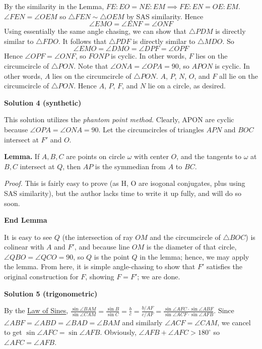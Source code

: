 \begin{enumerate}
 By the similarity in the Lemma, $FE: EO = NE: EM\implies FE: EN = OE: EM$. $\angle FEN = \angle OEM$ so $\triangle FEN\sim\triangle OEM$ by SAS similarity. Hence
 \[\angle EMO = \angle ENF = \angle ONF\]Using essentially the same angle chasing, we can show that $\triangle PDM$ is directly similar to $\triangle FDO$. It follows that $\triangle PDF$ is directly similar to $\triangle MDO$. So
 \[\angle EMO = \angle DMO = \angle DPF = \angle OPF\]Hence $\angle OPF = \angle ONF$, so $FONP$ is cyclic. In other words, $F$ lies on the circumcircle of $\triangle PON$. Note that $\angle ONA = \angle OPA = 90$, so $APON$ is cyclic. In other words, $A$ lies on the circumcircle of $\triangle PON$. $A$, $P$, $N$, $O$, and $F$ all lie on the circumcircle of $\triangle PON$. Hence $A$, $P$, $F$, and $N$ lie on a circle, as desired.

 



\textbf{Solution 4 (synthetic)}

This solution utilizes the \textit{phantom point method.} Clearly, APON are cyclic because $\angle OPA = \angle ONA = 90$. Let the circumcircles of triangles $APN$ and $BOC$ intersect at $F'$ and $O$. 

 \textbf{Lemma.} If $A,B,C$ are points on circle $\omega$ with center $O$, and the tangents to $\omega$ at $B,C$ intersect at $Q$, then $AP$ is the symmedian from $A$ to $BC$.

 \textit{Proof.} This is fairly easy to prove (as H, O are isogonal conjugates, plus using SAS similarity), but the author lacks time to write it up fully, and will do so soon.

 \textbf{End Lemma}

 It is easy to see $Q$ (the intersection of ray $OM$ and the circumcircle of $\triangle BOC$) is colinear with $A$ and $F'$, and because line $OM$ is the diameter of that circle, $\angle QBO = \angle QCO = 90$, so $Q$ is the point $Q$ in the lemma; hence, we may apply the lemma. From here, it is simple angle-chasing to show that $F'$ satisfies the original construction for $F$, showing $F=F'$; we are done.

 


 



\textbf{Solution 5 (trigonometric)}

By the \href{https://artofproblemsolving.com/wiki/index.php?title=Law\_of\_Sines}{Law of Sines}, $\frac {\sin\angle BAM}{\sin\angle CAM} = \frac {\sin B}{\sin C} = \frac bc = \frac {b/AF}{c/AF} = \frac {\sin\angle AFC\cdot\sin\angle ABF}{\sin\angle ACF\cdot\sin\angle AFB}$. Since $\angle ABF = \angle ABD = \angle BAD = \angle BAM$ and similarly $\angle ACF = \angle CAM$, we cancel to get $\sin\angle AFC = \sin\angle AFB$. Obviously, $\angle AFB + \angle AFC > 180^\circ$ so $\angle AFC = \angle AFB$.


\end{enumerate}
